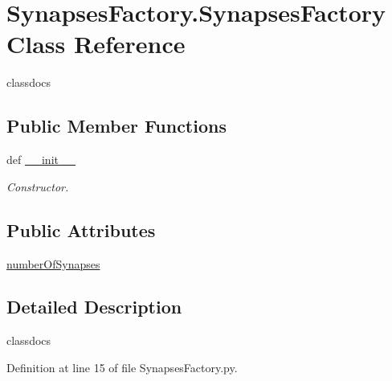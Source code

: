 \hypertarget{class_synapses_factory_1_1_synapses_factory}{\section{Synapses\-Factory.\-Synapses\-Factory Class Reference}
\label{class_synapses_factory_1_1_synapses_factory}
}


classdocs  


\subsection*{Public Member Functions}
\begin{DoxyCompactItemize}
\item 
def \hyperlink{class_synapses_factory_1_1_synapses_factory_a8b653e2419b9b65dd5b9feb89faf0eb4}{\-\_\-\-\_\-init\-\_\-\-\_\-}
\begin{DoxyCompactList}\small\item\em Constructor. \end{DoxyCompactList}\end{DoxyCompactItemize}
\subsection*{Public Attributes}
\begin{DoxyCompactItemize}
\item 
\hyperlink{class_synapses_factory_1_1_synapses_factory_af83fbc27851417b677391ece9bf49a29}{number\-Of\-Synapses}
\end{DoxyCompactItemize}


\subsection{Detailed Description}
classdocs 

Definition at line 15 of file Synapses\-Factory.\-py.



